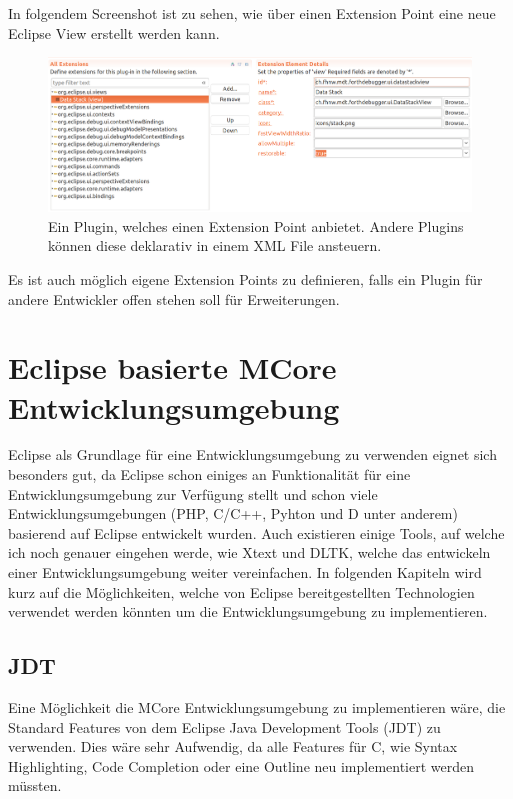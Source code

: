\newpage
In folgendem Screenshot ist zu sehen, wie über einen Extension Point eine neue Eclipse View erstellt werden kann.
\begin{figure}[H]
	\centering
		\includegraphics[scale=0.25]{platform/extensionpoint2.png}
		\caption{Ein Plugin, welches einen Extension Point anbietet. Andere Plugins können diese deklarativ in einem XML File ansteuern.}
		\label{fig:extensionpoint}
\end{figure}

Es ist auch möglich eigene Extension Points zu definieren, falls ein Plugin für andere Entwickler offen stehen soll für Erweiterungen.

\section{Eclipse basierte MCore Entwicklungsumgebung}

Eclipse als Grundlage für eine Entwicklungsumgebung zu verwenden eignet sich besonders gut, da Eclipse schon einiges an Funktionalität für eine Entwicklungsumgebung zur Verfügung stellt und schon viele Entwicklungsumgebungen (PHP, C/C++, Pyhton und D unter anderem) basierend auf Eclipse entwickelt wurden. Auch existieren einige Tools, auf welche ich noch genauer eingehen werde, wie Xtext und DLTK, welche das entwickeln einer Entwicklungsumgebung weiter vereinfachen. In folgenden Kapiteln wird kurz auf die Möglichkeiten, welche von Eclipse bereitgestellten Technologien verwendet werden könnten um die Entwicklungsumgebung zu implementieren.

\subsection{JDT}
Eine Möglichkeit die MCore Entwicklungsumgebung zu implementieren wäre, die Standard Features von dem Eclipse Java Development Tools (JDT) zu verwenden. Dies wäre sehr Aufwendig, da alle Features für C, wie Syntax Highlighting, Code Completion oder eine Outline neu implementiert werden müssten.

